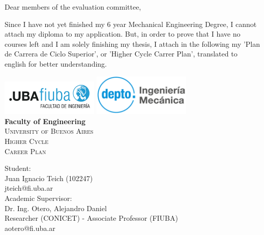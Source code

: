 \documentclass{article}
\newcommand{\thetitle}{Higher Cycle\\ Career Plan}
\newcommand{\theauthorJT}{Juan Ignacio Teich}
\newcommand{\thedate}{}
\numberwithin{equation}{subsection}
\begin{document}
\pagestyle{empty}

Dear members of the evaluation committee,

\indent \indent Since I have not yet finished my 6 year Mechanical Engineering Degree, I cannot attach my diploma to my application. But, in order to prove that I have no courses left and I am solely finishing my thesis, I attach in the following my 'Plan de Carrera de Ciclo Superior', or 'Higher Cycle Carrer Plan', translated to english for better understanding.


\newpage
\pagestyle{fancy}
\begin{titlepage}
    \begin{center}
    \includegraphics[width=0.35\textwidth]{Logo-fiuba-2.png} \hfill \includegraphics[width=0.35\textwidth]{depto.png}\\
    \vspace{1cm}
    {\bfseries \LARGE Faculty of Engineering}\\
    \vspace{0.5cm}
    {\scshape \Large University of Buenos Aires}\\
    \vspace{3cm}
    {\scshape \Huge \thetitle}\\
    \end{center}
    \vfill
    {\Large Student:\\[10pt] \indent\theauthorJT\; (102247)\\[10pt] \indent jteich@fi.uba.ar}\\[20pt]
    {\Large Academic Supervisor:\\[10pt] \indent Dr. Ing. Otero, Alejandro Daniel\\[10pt] \indent Researcher (CONICET) - Associate Professor (FIUBA) \\[10pt] \indent aotero@fi.uba.ar}\\
    \vfill
    \begin{center}
		{\large \thedate}
    \end{center}
\end{titlepage}
\end{document}
